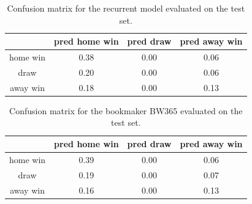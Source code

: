 \documentclass[a4paper]{article}
\begin{document}
\begin{table}
\begin{tabular}{|c||c|c|c|}
\hline 
 & pred home win & pred draw  & pred away win \\ 
\hline 
\hline
home win & 0.38 & 0.00 & 0.06 \\ 
\hline 
draw & 0.20 & 0.00 & 0.06 \\ 
\hline 
away win & 0.18 & 0.00 & 0.13 \\ 
\hline 
\end{tabular} 
\caption{Confusion matrix for the recurrent model evaluated on the test set.}
\label{tab:confrnn}
\end{table}


\begin{table}
\begin{tabular}{|c||c|c|c|}
\hline 
 & pred home win & pred draw  & pred away win \\ 
\hline 
\hline
home win & 0.39 & 0.00 & 0.06 \\ 
\hline 
draw & 0.19 & 0.00 & 0.07 \\ 
\hline 
away win & 0.16 & 0.00 & 0.13 \\ 
\hline 
\end{tabular} 
\caption{Confusion matrix for the bookmaker BW365 evaluated on the test set.}
\label{tab:confbm}
\end{table}
\end{document}
